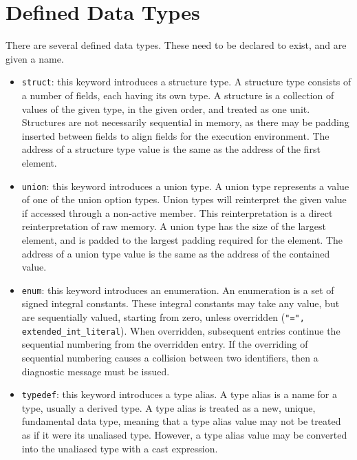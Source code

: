 \documentclass[letterpaper,12pt]{book}
\begin{document}
\section{Defined Data Types}

There are several defined data types. These need to be declared to exist, and are given a name.

\begin{itemize}
	\item \texttt{struct}: this keyword introduces a structure type. A structure type consists of a number of fields, each having its own type. A structure is a collection of values of the given type, in the given order, and treated as one unit. Structures are not necessarily sequential in memory, as there may be padding inserted between fields to align fields for the execution environment. The address of a structure type value is the same as the address of the first element.
	
	\item \texttt{union}: this keyword introduces a union type. A union type represents a value of one of the union option types. Union types will reinterpret the given value if accessed through a non-active member. This reinterpretation is a direct reinterpretation of raw memory. A union type has the size of the largest element, and is padded to the largest padding required for the element. The address of a union type value is the same as the address of the contained value.
	
	\item \texttt{enum}: this keyword introduces an enumeration. An enumeration is a set of signed integral constants. These integral constants may take any value, but are sequentially valued, starting from zero, unless overridden (\texttt{"=", extended\_int\_literal}). When overridden, subsequent entries continue the sequential numbering from the overridden entry. If the overriding of sequential numbering causes a collision between two identifiers, then a diagnostic message must be issued.
	
	\item \texttt{typedef}: this keyword introduces a type alias. A type alias is a name for a type, usually a derived type. A type alias is treated as a new, unique, fundamental data type, meaning that a type alias value may not be treated as if it were its unaliased type. However, a type alias value may be converted into the unaliased type with a cast expression.
\end{itemize}
\end{document}
